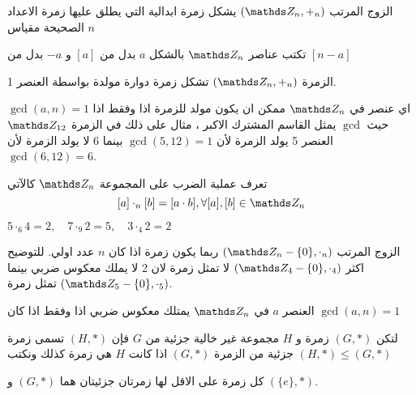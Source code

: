 \begin{theorem}
	الزوج المرتب  $(\Z_n, +_n)$ يشكل زمرة ابدالية التي يطلق عليها زمرة الاعداد الصحيحة مقياس $n$
\end{theorem}

\begin{note}
	تكتب عناصر $\Z_n$ بالشكل $a$ بدل من $[a]$ و $-a$ بدل من $[n-a]$
\end{note}

\begin{theorem}
	الزمرة $(\Z_n, +_n)$ تشكل زمرة دوارة مولدة بواسطة العنصر 1.
\end{theorem}

\begin{note}
	اي عنصر في $\Z_n$ ممكن ان يكون مولد للزمرة اذا وفقط اذا $\gcd(a,n)=1$
	حيث $\gcd$ يمثل القاسم المشترك  الاكبر ، مثال على ذلك في الزمرة $\Z_{12}$ العنصر 5 يولد الزمرة لأن $\gcd(5, 12)=1$ بينما 6 لا يولد الزمرة لأن $\gcd(6,12) = 6 $.
\end{note}
\begin{note}
 تعرف عملية الضرب على المجموعة $\Z_n$ كالآتي 
\[
[a] \cdot_n [b] = [a\cdot b] , \forall [a],[b] \in \Z_n
\]
\end{note}

\begin{example}
	$5\cdot_6 4 =2,\quad 7\cdot_9 2=5,\quad 3\cdot_4 2=2$
\end{example}

\begin{note}
	الزوج المرتب $(\Z_n - \{0\}, \cdot_n)$ ربما يكون زمرة اذا كان $n$ عدد اولي. للتوضيح اكثر $(\Z_4-\{0\}, \cdot_4)$ لا تمثل زمرة لان 2 لا يملك معكوس ضربي بينما $(\Z_5-\{0\},\cdot_5)$ تمثل زمرة.
\end{note}

\begin{note}
	العنصر $a$ في $\Z_n$ يمتلك معكوس ضربي اذا وفقط اذا كان $\gcd(a,n)=1$
\end{note}


\begin{definition}
	لتكن $(G, *)$ زمرة و $H$ مجموعة غير خالية جزئية من $G$ فإن $(H, *)$ تسمى زمرة جزئية من الزمرة $(G, *)$ اذا كانت $H$ هي زمرة كذلك ونكتب $(H, *)\leq (G, *)$
\end{definition}
\begin{example}
	كل زمرة على الاقل لها زمرتان جزئيتان هما $(G, *) $ و $(\{e\}, *)$.
\end{example}

